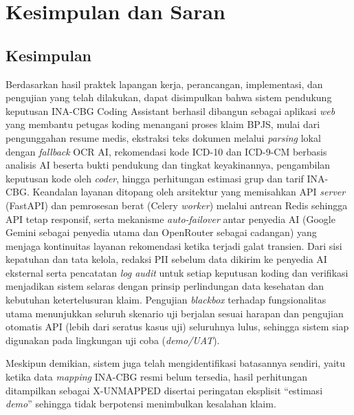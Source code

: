 \chapter{Kesimpulan dan Saran}

\section{Kesimpulan}
Berdasarkan hasil praktek lapangan kerja, perancangan, implementasi, dan pengujian yang telah dilakukan, dapat disimpulkan bahwa sistem pendukung keputusan INA-CBG Coding Assistant berhasil dibangun sebagai aplikasi \textit{web} yang membantu petugas koding menangani proses klaim BPJS, mulai dari pengunggahan resume medis, ekstraksi teks dokumen melalui \textit{parsing} lokal dengan \textit{fallback} OCR AI, rekomendasi kode ICD-10 dan ICD-9-CM berbasis analisis AI beserta bukti pendukung dan tingkat keyakinannya, pengambilan keputusan kode oleh \textit{coder}, hingga perhitungan estimasi grup dan tarif INA-CBG. Keandalan layanan ditopang oleh arsitektur yang memisahkan API \textit{server} (FastAPI) dan pemrosesan berat (Celery \textit{worker}) melalui antrean Redis sehingga API tetap responsif, serta mekanisme \textit{auto-failover} antar penyedia AI (Google Gemini sebagai penyedia utama dan OpenRouter sebagai cadangan) yang menjaga kontinuitas layanan rekomendasi ketika terjadi galat transien. Dari sisi kepatuhan dan tata kelola, redaksi PII sebelum data dikirim ke penyedia AI eksternal serta pencatatan \textit{log audit} untuk setiap keputusan koding dan verifikasi menjadikan sistem selaras dengan prinsip perlindungan data kesehatan dan kebutuhan ketertelusuran klaim. Pengujian \textit{blackbox} terhadap fungsionalitas utama menunjukkan seluruh skenario uji berjalan sesuai harapan dan pengujian otomatis API (lebih dari seratus kasus uji) seluruhnya lulus, sehingga sistem siap digunakan pada lingkungan uji coba (\textit{demo/UAT}).

Meskipun demikian, sistem juga telah mengidentifikasi batasannya sendiri, yaitu ketika data \textit{mapping} INA-CBG resmi belum tersedia, hasil perhitungan ditampilkan sebagai X-UNMAPPED disertai peringatan eksplisit ``estimasi \textit{demo}'' sehingga tidak berpotensi menimbulkan kesalahan klaim.


